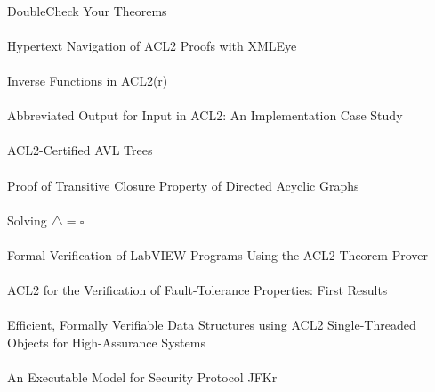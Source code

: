 \documentclass{article}
\begin{document}
\cite{09-eastlund-doublecheck} \\
{DoubleCheck} Your Theorems \\

\cite{09-garcia-dominguez-xmleye} \\
Hypertext Navigation of {ACL2} Proofs with {XMLEye} \\

\cite{09-gamboa-inverse} \\
Inverse Functions in {ACL2(r)} \\

\cite{09-kaufmann-abbreviated} \\
Abbreviated Output for Input in {ACL2}: An Implementation Case Study \\

\cite{09-ralston-avl} \\
{ACL2}-Certified {AVL} Trees \\

\cite{09-fraij-dags} \\
Proof of Transitive Closure Property of Directed Acyclic Graphs \\

\cite{09-cowles-solving} \\
Solving $\triangle = \square$ \\

\cite{09-kaufmann-labview} \\
Formal Verification of {LabVIEW} Programs Using the {ACL2} Theorem Prover \\

\cite{09-pierre-properties} \\
{ACL2} for the Verification of Fault-Tolerance Properties: First Results \\

\cite{09-hardin-stobjs} \\
Efficient, Formally Verifiable Data Structures using {ACL2} Single-Threaded Objects for High-Assurance Systems \\

\cite{09-rager-jfkr} \\
An Executable Model for Security Protocol {JFKr} \\
\end{document}
